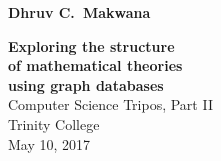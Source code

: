 \pagestyle{empty}

\hfill{\Large \sffamily \bfseries Dhruv C.\ Makwana}

\vspace*{60mm}
\begin{center}
\Huge
{\sf \bfseries Exploring the structure \\ of mathematical theories \\ using graph databases} \\
\vspace*{5mm}
Computer Science Tripos, Part II \\
\vspace*{5mm}
Trinity College \\
\vspace*{5mm}
May 10, 2017
\end{center}
